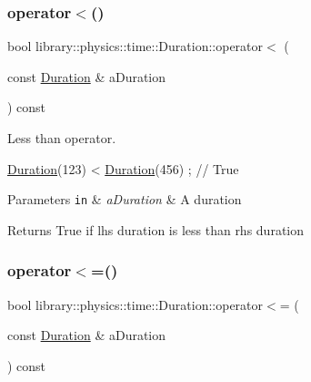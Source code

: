\subsubsection{\texorpdfstring{operator$<$()}{operator<()}}
{\footnotesize\ttfamily bool library\+::physics\+::time\+::\+Duration\+::operator$<$ (\begin{DoxyParamCaption}\item[{const \hyperlink{classlibrary_1_1physics_1_1time_1_1_duration}{Duration} \&}]{a\+Duration }\end{DoxyParamCaption}) const}



Less than operator. 


\begin{DoxyCode}
\hyperlink{classlibrary_1_1physics_1_1time_1_1_duration_a0a70efcf487a841da572afcf00001f64}{Duration}(123) < \hyperlink{classlibrary_1_1physics_1_1time_1_1_duration_a0a70efcf487a841da572afcf00001f64}{Duration}(456) ; \textcolor{comment}{// True}
\end{DoxyCode}



\begin{DoxyParams}[1]{Parameters}
\mbox{\tt in}  & {\em a\+Duration} & A duration \\
\hline
\end{DoxyParams}
\begin{DoxyReturn}{Returns}
True if lhs duration is less than rhs duration 
\end{DoxyReturn}
\mbox{\label{classlibrary_1_1physics_1_1time_1_1_duration_a95d806324b7235b0dec175bde4996e7c}} 
\subsubsection{\texorpdfstring{operator$<$=()}{operator<=()}}
{\footnotesize\ttfamily bool library\+::physics\+::time\+::\+Duration\+::operator$<$= (\begin{DoxyParamCaption}\item[{const \hyperlink{classlibrary_1_1physics_1_1time_1_1_duration}{Duration} \&}]{a\+Duration }\end{DoxyParamCaption}) const}



